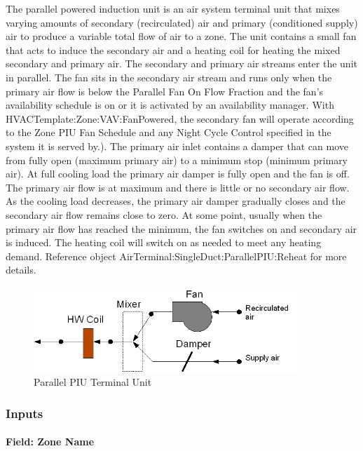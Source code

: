 The parallel powered induction unit is an air system terminal unit that mixes varying amounts of secondary (recirculated) air and primary (conditioned supply) air to produce a variable total flow of air to a zone. The unit contains a small fan that acts to induce the secondary air and a heating coil for heating the mixed secondary and primary air. The secondary and primary air streams enter the unit in parallel. The fan sits in the secondary air stream and runs only when the primary air flow is below the Parallel Fan On Flow Fraction and the fan's availability schedule is on or it is activated by an availability manager. With HVACTemplate:Zone:VAV:FanPowered, the secondary fan will operate according to the Zone PIU Fan Schedule and any Night Cycle Control specified in the system it is served by.). The primary air inlet contains a damper that can move from fully open (maximum primary air) to a minimum stop (minimum primary air). At full cooling load the primary air damper is fully open and the fan is off. The primary air flow is at maximum and there is little or no secondary air flow. As the cooling load decreases, the primary air damper gradually closes and the secondary air flow remains close to zero. At some point, usually when the primary air flow has reached the minimum, the fan switches on and secondary air is induced. The heating coil will switch on as needed to meet any heating demand. Reference object AirTerminal:SingleDuct:ParallelPIU:Reheat for more details.

\begin{figure}[hbtp] %
\centering
\includegraphics[width=0.9\textwidth, height=0.9\textheight, keepaspectratio=true]{media/image609.png}
\caption{Parallel PIU Terminal Unit \protect \label{fig:parallel-piu-terminal-unit-001}}
\end{figure}

\subsubsection{Inputs}\label{inputs-2016-06-16-1620}

\paragraph{Field: Zone Name}\label{field-zone-name-2016-06-16-1620}

